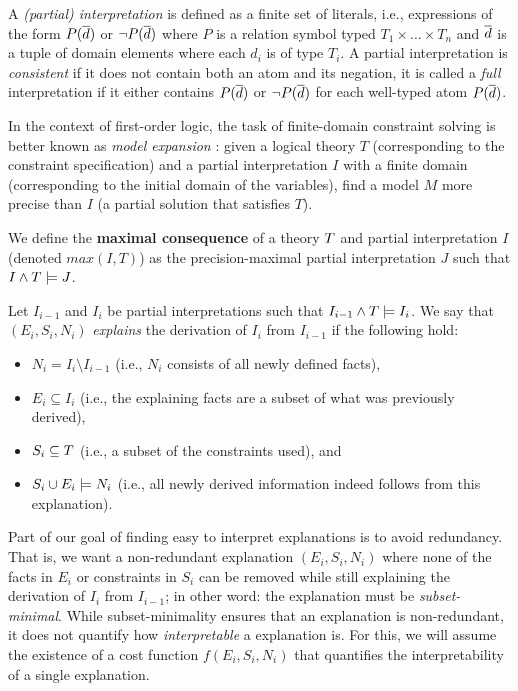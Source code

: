 
A \emph{(partial) interpretation} is defined as a finite set of literals, i.e., expressions of the form $P(\overline{d})$ or $\lnot P(\overline{d})$ where $P$ is a relation symbol typed $T_1\times\dots \times T_n$ and $\overline{d}$ is a tuple of domain elements where each $d_i$ is of type $T_i$. 
A partial interpretation is \emph{consistent} if it does not contain both an atom and its negation, it is called a \emph{full} interpretation if it either contains $P(\overline{d})$ or $\lnot P(\overline{d})$ for each well-typed atom $P(\overline{d})$. 

In the context of first-order logic, the task of finite-domain constraint solving is better known as \emph{model expansion} \cite{MitchellTHM06}: given a logical theory $T$ (corresponding to the constraint specification) and a partial interpretation $I$ with a finite domain (corresponding to the initial domain of the variables), find a model $M$ more precise than $I$ (a partial solution that satisfies $T$).

We define the \textbf{maximal consequence} of a theory $T$ and partial interpretation $I$ (denoted $max(I,T)$) as the precision-maximal partial interpretation $J$ such that  $I \wedge T \models J$.

Let $I_{i-1}$ and $I_i$ be partial interpretations such that $I_{i-1}\land T \models I_i$.
We say that $(E_i,S_i,N_i)$ \emph{explains} the derivation of $I_{i}$ from $I_{i-1}$ if the following hold:
\begin{itemize}
   \item $N_i= I_i \setminus I_{i-1}$ (i.e., $N_i$ consists of all newly defined facts), 
   \item $E_i\subseteq I_i$ (i.e., the explaining facts are a subset of what was previously derived),
   \item $S_i \subseteq T$ (i.e., a subset of the constraints used), and 
   \item $S_i \cup E_i \models N_i$ (i.e., all newly derived information indeed follows from this explanation).
\end{itemize}

Part of our goal of finding easy to interpret explanations is to avoid redundancy.
That is, we want a non-redundant explanation $(E_i,S_i,N_i)$ where none of the facts in $E_i$ or constraints in $S_i$ can be removed while still explaining the derivation of $I_i$ from $I_{i-1}$; in other word: the explanation must be \textit{subset-minimal}. 
While subset-minimality ensures that an explanation is non-redundant, it does not quantify how \textit{interpretable} a explanation is.
For this, we will assume the existence of a cost function $f(E_i,S_i,N_i)$ that quantifies the interpretability of a single explanation.

